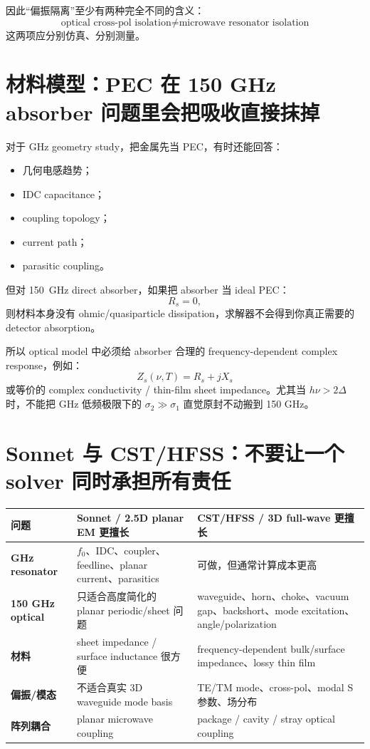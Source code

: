 \documentclass[11pt,a4paper,openany]{ctexrep}
\begin{document}
因此“偏振隔离”至少有两种完全不同的含义：
\[
\boxed{
\text{optical cross-pol isolation}
\neq
\text{microwave resonator isolation}
}
\]
这两项应分别仿真、分别测量。

\section{材料模型：PEC 在 150 GHz absorber 问题里会把吸收直接抹掉}

对于 GHz geometry study，把金属先当 PEC，有时还能回答：
\begin{itemize}
  \item 几何电感趋势；
  \item IDC capacitance；
  \item coupling topology；
  \item current path；
  \item parasitic coupling。
\end{itemize}

但对 \SI{150}{GHz} direct absorber，如果把 absorber 当 ideal PEC：
\[
R_s=0,
\]
则材料本身没有 ohmic/quasiparticle dissipation，求解器不会得到你真正需要的 detector absorption。

所以 optical model 中必须给 absorber 合理的 frequency-dependent complex response，例如：
\[
Z_s(\nu,T)=R_s+jX_s
\]
或等价的 complex conductivity / thin-film sheet impedance。尤其当 $h\nu>2\Delta$ 时，不能把 GHz 低频极限下的 $\sigma_2\gg\sigma_1$ 直觉原封不动搬到 150 GHz。

\section{Sonnet 与 CST/HFSS：不要让一个 solver 同时承担所有责任}

\begin{center}
\begin{tabularx}{0.96\linewidth}{>{\bfseries}p{28mm}XX}
\toprule
问题 & Sonnet / 2.5D planar EM 更擅长 & CST/HFSS / 3D full-wave 更擅长 \\
\midrule
GHz resonator & $f_0$、IDC、coupler、feedline、planar current、parasitics & 可做，但通常计算成本更高 \\
150 GHz optical & 只适合高度简化的 planar periodic/sheet 问题 & waveguide、horn、choke、vacuum gap、backshort、mode excitation、angle/polarization \\
材料 & sheet impedance / surface inductance 很方便 & frequency-dependent bulk/surface impedance、lossy thin film \\
偏振/模态 & 不适合真实 3D waveguide mode basis & TE/TM mode、cross-pol、modal S 参数、场分布 \\
阵列耦合 & planar microwave coupling & package / cavity / stray optical coupling \\
\bottomrule
\end{tabularx}
\end{center}
\end{document}
